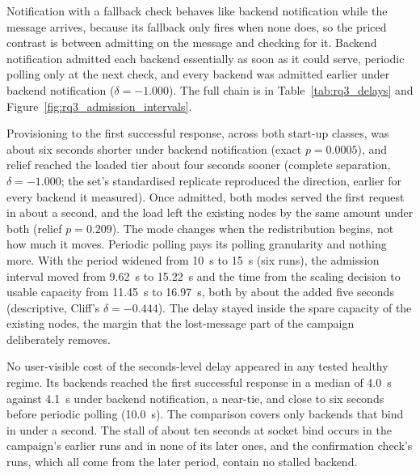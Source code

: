 ﻿\documentclass[12pt,reqno,twoside]{amsbook}
\begin{document}
Notification with a fallback check behaves like backend notification
while the message arrives, because its fallback only fires when none
does, so the priced contrast is between admitting on the message and
checking for it. Backend notification admitted each backend essentially as
soon as it could serve, periodic polling only at the next check, and every
backend was admitted earlier under backend notification ($\delta = -1.000$).
The full chain is in Table~\ref{tab:rq3_delays} and
Figure~\ref{fig:rq3_admission_intervals}.

Provisioning to the first successful response, across both start-up classes,
was about six seconds shorter under backend notification (exact
$p = 0.0005$), and relief reached the loaded tier about four seconds sooner
(complete separation, $\delta = -1.000$; the set's standardised replicate
reproduced the direction, earlier for every backend it measured). Once admitted, both modes served the first
request in about a second, and the load left the existing nodes by the
same amount under both (relief $p = 0.209$). The mode changes when the
redistribution begins, not how much it moves.
Periodic polling pays its polling granularity and nothing more. With
the period widened from 10~s to 15~s (six runs), the admission interval
moved from 9.62~s to 15.22~s and the time from the scaling decision to
usable capacity from 11.45~s to 16.97~s, both by about the added five
seconds (descriptive, Cliff's $\delta = -0.444$). The delay stayed
inside the spare capacity of the existing nodes, the margin that the
lost-message part of the campaign deliberately removes.

No user-visible cost of the seconds-level delay appeared in any tested 
healthy regime. Its backends reached the first successful response in 
a median of 4.0~s against  4.1~s under backend notification, a near-tie, 
and close to six seconds before periodic polling (10.0~s). The comparison 
covers only backends that bind in under a second.
The stall of about ten seconds at socket bind occurs in the campaign's
earlier runs and in none of its later ones, and the confirmation check's
runs, which all come from the later period, contain no stalled backend.
\end{document}
